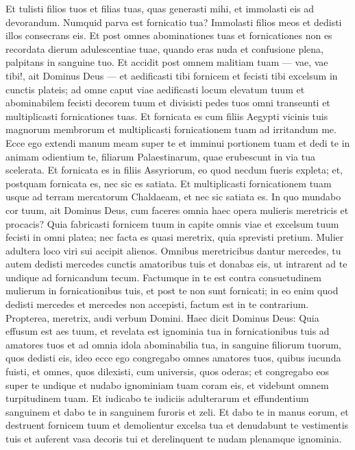 \begin{biblechapter}
\verse Et tulisti filios tuos et filias tuas, quas generasti mihi, et immolasti eis ad devorandum. Numquid parva est fornicatio tua? 
\verse Immolasti filios meos et dedisti illos consecrans eis. 
\verse Et post omnes abominationes tuas et fornicationes non es recordata dierum adulescentiae tuae, quando eras nuda et confusione plena, palpitans in sanguine tuo. 
\verse Et accidit post omnem malitiam tuam — vae, vae tibi!, ait Dominus Deus — 
\verse et aedificasti tibi fornicem et fecisti tibi excelsum in cunctis plateis;  
\verse ad omne caput viae aedificasti locum elevatum tuum et abominabilem fecisti decorem tuum et divisisti pedes tuos omni transeunti et multiplicasti fornicationes tuas. 
\verse Et fornicata es cum filiis Aegypti vicinis tuis magnorum membrorum et multiplicasti fornicationem tuam ad irritandum me. 
\verse Ecce ego extendi manum meam super te et imminui portionem tuam et dedi te in animam odientium te, filiarum Palaestinarum, quae erubescunt in via tua scelerata. 
\verse Et fornicata es in filiis Assyriorum, eo quod necdum fueris expleta; et, postquam fornicata es, nec sic es satiata. 
\verse Et multiplicasti fornicationem tuam usque ad terram mercatorum Chaldaeam, et nec sic satiata es. 
\verse In quo mundabo cor tuum, ait Dominus Deus, cum faceres omnia haec opera mulieris meretricis et procacis? 
\verse Quia fabricasti fornicem tuum in capite omnis viae et excelsum tuum fecisti in omni platea; nec facta es quasi meretrix, quia sprevisti pretium. 
\verse Mulier adultera loco viri sui accipit alienos. 
\verse Omnibus meretricibus dantur mercedes, tu autem dedisti mercedes cunctis amatoribus tuis et donabas eis, ut intrarent ad te undique ad fornicandum tecum.  
\verse Factumque in te est contra consuetudinem mulierum in fornicationibus tuis, et post te non sunt fornicati; in eo enim quod dedisti mercedes et mercedes non accepisti, factum est in te contrarium. 
\verse Propterea, meretrix, audi verbum Domini. 
\verse Haec dicit Dominus Deus: Quia effusum est aes tuum, et revelata est ignominia tua in fornicationibus tuis ad amatores tuos et ad omnia idola abominabilia tua, in sanguine filiorum tuorum, quos dedisti eis, 
\verse ideo ecce ego congregabo omnes amatores tuos, quibus iucunda fuisti, et omnes, quos dilexisti, cum universis, quos oderas; et congregabo eos super te undique et nudabo ignominiam tuam coram eis, et videbunt omnem turpitudinem tuam. 
\verse Et iudicabo te iudiciis adulterarum et effundentium sanguinem et dabo te in sanguinem furoris et zeli. 
\verse Et dabo te in manus eorum, et destruent fornicem tuum et demolientur excelsa tua et denudabunt te vestimentis tuis et auferent vasa decoris tui et derelinquent te nudam plenamque ignominia. 

\end{biblechapter}
